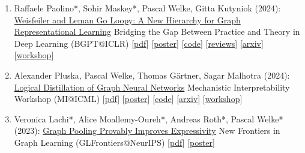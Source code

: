 \documentclass{scrartcl}
\begin{document}
\begin{enumerate}
{[\href{https://pwelke.de/publications/jogl2024expressivitynotessentialposter.pdf}{poster}]
[\href{https://github.com/ocatias/KnowledgeDistillationGNNs_SciForDL}{code}]
[\href{https://openreview.net/forum?id=5v7hpSy3Ir}{reviews}]
[\href{https://scienceofdlworkshop.github.io}{workshop}]
}
\item
\label{maskey2024loopybgpt}
Raffaele Paolino*, Sohir Maskey*, Pascal Welke, Gitta Kutyniok (2024):\newline
\href{https://pwelke.de/publications/paolino2024loopyarxiv.pdf}{Weisfeiler and Leman Go Loopy: A New Hierarchy for Graph Representational Learning}\newline
Bridging the Gap Between Practice and Theory in Deep Learning (BGPT@ICLR)\newline
{\footnotesize
[\href{https://pwelke.de/publications/paolino2024loopyarxiv.pdf}{pdf}]
[\href{https://pwelke.de/publications/paolino2024loopyBGPTposter.pdf}{poster}]
[\href{https://github.com/RPaolino/loopy}{code}]
[\href{https://openreview.net/forum?id=ESTxJjN3tE}{reviews}]
[\href{https://arxiv.org/abs/2403.13749}{arxiv}]
[\href{https://sites.google.com/view/bgpt-iclr24/home}{workshop}]
}
\item
\label{pluska2024logicaldistillationmi}
Alexander Pluska, Pascal Welke, Thomas Gärtner, Sagar Malhotra (2024):\newline
\href{https://pwelke.de/publications/pluska2024logicaldistillationkr.pdf}{Logical Distillation of Graph Neural Networks}\newline
Mechanistic Interpretability Workshop (MI@ICML)\newline
{\footnotesize
[\href{https://pwelke.de/publications/pluska2024logicaldistillationkr.pdf}{pdf}]
[\href{https://pwelke.de/publications/pluska2024logicaldistillationmiposter.pdf}{poster}]
[\href{https://github.com/lexpk/LogicalDistillationOfGNNs}{code}]
[\href{https://arxiv.org/abs/2406.07126}{arxiv}]
[\href{https://icml2024mi.pages.dev/}{workshop}]
}
\item
\label{lmrw2023graphpooling}
Veronica Lachi*, Alice Moallemy-Oureh*, Andreas Roth*, Pascal Welke* (2023):\newline
\href{https://openreview.net/forum?id=lR5NYB9zrv}{Graph Pooling Provably Improves Expressivity}\newline
New Frontiers in Graph Learning (GLFrontiers@NeurIPS)\newline
{\footnotesize
[\href{https://pwelke.de/publications/lmrw2023pooling.pdf}{pdf}]
[\href{https://pwelke.de/publications/lmrw2023pooling-poster.pdf}{poster}]
}
\end{enumerate}
\end{document}
